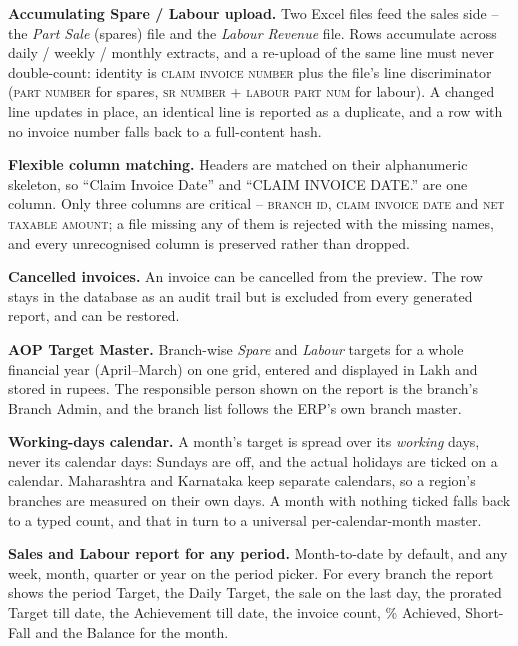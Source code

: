 \documentclass[11pt,a4paper]{article}
\newcommand{\qt}[1]{\textquotedblleft #1\textquotedblright}
\newcommand{\col}[1]{\textsc{\small #1}}
\begin{document}
\begin{reqlist}

\item \textbf{Accumulating Spare / Labour upload.} Two Excel files feed the sales side --
the \emph{Part Sale} (spares) file and the \emph{Labour Revenue} file. Rows accumulate
across daily / weekly / monthly extracts, and a re-upload of the same line must never
double-count: identity is \col{claim invoice number} plus the file's line discriminator
(\col{part number} for spares, \col{sr number} + \col{labour part num} for labour). A
changed line updates in place, an identical line is reported as a duplicate, and a row
with no invoice number falls back to a full-content hash.

\item \textbf{Flexible column matching.} Headers are matched on their alphanumeric
skeleton, so \qt{Claim Invoice Date} and \qt{CLAIM  INVOICE DATE.} are one column. Only
three columns are critical -- \col{branch id}, \col{claim invoice date} and
\col{net taxable amount}; a file missing any of them is rejected with the missing names,
and every unrecognised column is preserved rather than dropped.

\item \textbf{Cancelled invoices.} An invoice can be cancelled from the preview. The row
stays in the database as an audit trail but is excluded from every generated report, and
can be restored.

\item \textbf{AOP Target Master.} Branch-wise \emph{Spare} and \emph{Labour} targets for a
whole financial year (April--March) on one grid, entered and displayed in Lakh and stored
in rupees. The responsible person shown on the report is the branch's Branch Admin, and
the branch list follows the ERP's own branch master.

\item \textbf{Working-days calendar.} A month's target is spread over its \emph{working}
days, never its calendar days: Sundays are off, and the actual holidays are ticked on a
calendar. Maharashtra and Karnataka keep separate calendars, so a region's branches are
measured on their own days. A month with nothing ticked falls back to a typed count, and
that in turn to a universal per-calendar-month master.

\item \textbf{Sales and Labour report for any period.} Month-to-date by default, and any
week, month, quarter or year on the period picker. For every branch the report shows the
period Target, the Daily Target, the sale on the last day, the prorated Target till date,
the Achievement till date, the invoice count, \% Achieved, Short-Fall and the Balance for
the month.


\end{reqlist}
\end{document}
